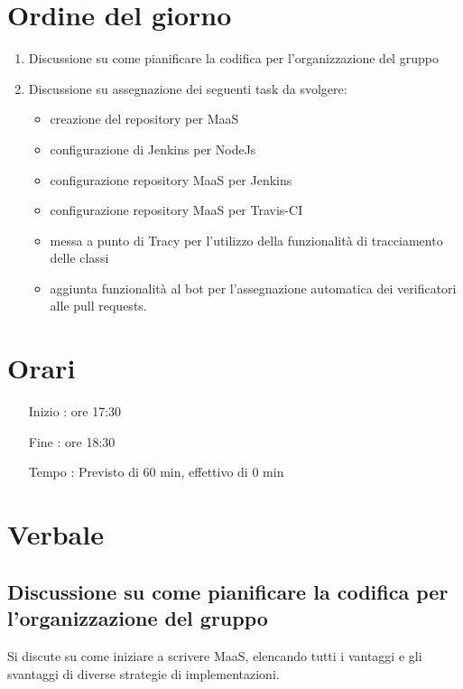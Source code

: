 \documentclass[11pt]{meetingmins}
\begin{document}
\maketitle

\section{Ordine del giorno}

\begin{enumerate}

\item Discussione su come pianificare la codifica per l'organizzazione del gruppo
\item Discussione su assegnazione dei seguenti task da svolgere:
  
  \begin{itemize}

  \item creazione del repository per MaaS
  \item configurazione di Jenkins per NodeJs
  \item configurazione repository MaaS per Jenkins
  \item configurazione repository MaaS per Travis-CI
  \item messa a punto di Tracy per l'utilizzo della funzionalità di tracciamento delle classi
  \item aggiunta funzionalità al bot per l'assegnazione automatica dei verificatori alle pull requests.
  \end{itemize}

\end{enumerate}

\section{Orari}

\begin{itemize}
\item[Inizio]: ore 17:30
\item[Fine]: ore 18:30
\item[Tempo]: Previsto di 60 min, effettivo di 0 min

\end{itemize}

\section{Verbale}

\subsection{Discussione su come pianificare la codifica per l'organizzazione del gruppo}

Si discute su come iniziare a scrivere MaaS, elencando tutti i vantaggi e gli svantaggi di diverse strategie di implementazioni.

\end{document}
